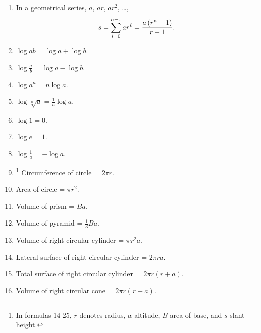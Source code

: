 \begin{enumerate}
\item
In a geometrical series, $a$, $ar$, $ar^2$, \ldots,
\[
s = \sum_{i = 0}^{n - 1}ar^i
  = \frac{a \left(r^n - 1 \right)}{r-1}
\textnormal{.}
\]

\item
$\log ab = \log a + \log b$.

\item
$\log \frac{a}{b} = \log a - \log b$.

\item
$\log a^n = n\log a$.

\item
$\log \sqrt[n]{a} = \frac{1}{n} \log a$.

\item
$\log 1 = 0$.

\item
$\log e = 1$.

\item
$\log \frac{1}{a} = -\log a$.

\item \footnote{In formulas 14-25, $r$ denotes radius, 
$a$ altitude, $B$ area of base, and $s$ slant height.}
Circumference of circle = $2 \pi r$. 

\item
Area of circle = $\pi r^2$.

\item
Volume of prism = $Ba$.
 
\item
Volume of pyramid = $\frac{1}{3} Ba$.

\item
Volume of right circular cylinder = $\pi r^2a$.
 
\item
Lateral surface of right circular cylinder = $2 \pi ra$.

\item
Total surface of right circular cylinder = $2 \pi r\left(r + a\right)$.

\item
Volume of right circular cone = $2 \pi r\left(r + a\right)$.


\end{enumerate}
